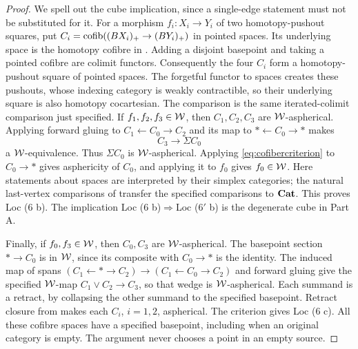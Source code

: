 \begin{proof}
We spell out the cube implication, since a single-edge statement must not be substituted for it. For a morphism $f_i:X_i\to Y_i$ of two homotopy-pushout squares, put $C_i=\operatorname{cofib}((BX_i)_+\to(BY_i)_+)$ in pointed spaces. Its underlying space is the homotopy cofibre in . Adding a disjoint basepoint and taking a pointed cofibre are colimit functors. Consequently the four $C_i$ form a homotopy-pushout square of pointed spaces. The forgetful functor to spaces creates these pushouts, whose indexing category is weakly contractible, so their underlying square is also homotopy cocartesian. The comparison is the same iterated-colimit comparison just specified. If $f_1,f_2,f_3\in\mathcal{W}$, then $C_1,C_2,C_3$ are $\mathcal{W}$-aspherical. Applying forward gluing to $C_1\leftarrow C_0\to C_2$ and its map to $*\leftarrow C_0\to *$ makes
\[
 C_3\longrightarrow\Sigma C_0
\]
a $\mathcal{W}$-equivalence. Thus $\Sigma C_0$ is $\mathcal{W}$-aspherical. Applying \eqref{eq:cofibercriterion} to $C_0\to *$ gives asphericity of $C_0$, and applying it to $f_0$ gives $f_0\in\mathcal{W}$. Here statements about spaces are interpreted by their simplex categories; the natural last-vertex comparisons of \citet[Proposition 2.2.3 and Corollary 2.2.4]{RootCisinski2004} transfer the specified comparisons to $\mathbf{Cat}$. This proves Loc (6 b). The implication Loc (6 b)$\Rightarrow$Loc ($6'$ b) is the degenerate cube in Part A.

Finally, if $f_0,f_3\in\mathcal{W}$, then $C_0,C_3$ are $\mathcal{W}$-aspherical. The basepoint section $*\to C_0$ is in $\mathcal{W}$, since its composite with $C_0\to *$ is the identity. The induced map of spans $(C_1\leftarrow *\to C_2)\to(C_1\leftarrow C_0\to C_2)$ and forward gluing give the specified $\mathcal{W}$-map $C_1\vee C_2\to C_3$, so that wedge is $\mathcal{W}$-aspherical. Each summand is a retract, by collapsing the other summand to the specified basepoint. Retract closure from  makes each $C_i$, $i=1,2$, aspherical. The criterion gives Loc (6 c). All these cofibre spaces have a specified basepoint, including when an original category is empty. The argument never chooses a point in an empty source.
\end{proof}

